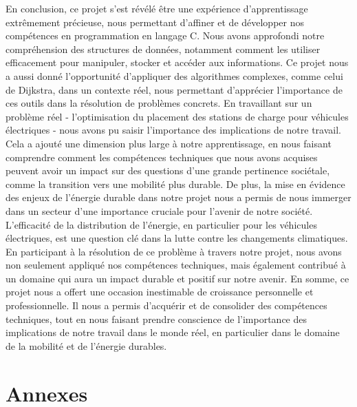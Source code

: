 \documentclass[french,a4paper]{article}
\begin{document}
    En conclusion, ce projet s'est révélé être une expérience d'apprentissage extrêmement précieuse, nous permettant d'affiner et de développer nos compétences en programmation en langage C. Nous avons approfondi notre compréhension des structures de données, notamment comment les utiliser efficacement pour manipuler, stocker et accéder aux informations. Ce projet nous a aussi donné l'opportunité d'appliquer des algorithmes complexes, comme celui de Dijkstra, dans un contexte réel, nous permettant d'apprécier l'importance de ces outils dans la résolution de problèmes concrets.
    \newline
    En travaillant sur un problème réel - l'optimisation du placement des stations de charge pour véhicules électriques - nous avons pu saisir l'importance des implications de notre travail. Cela a ajouté une dimension plus large à notre apprentissage, en nous faisant comprendre comment les compétences techniques que nous avons acquises peuvent avoir un impact sur des questions d'une grande pertinence sociétale, comme la transition vers une mobilité plus durable.
    \newline
    De plus, la mise en évidence des enjeux de l'énergie durable dans notre projet nous a permis de nous immerger dans un secteur d'une importance cruciale pour l'avenir de notre société. L'efficacité de la distribution de l'énergie, en particulier pour les véhicules électriques, est une question clé dans la lutte contre les changements climatiques. En participant à la résolution de ce problème à travers notre projet, nous avons non seulement appliqué nos compétences techniques, mais également contribué à un domaine qui aura un impact durable et positif sur notre avenir.
    \newline
    En somme, ce projet nous a offert une occasion inestimable de croissance personnelle et professionnelle. Il nous a permis d'acquérir et de consolider des compétences techniques, tout en nous faisant prendre conscience de l'importance des implications de notre travail dans le monde réel, en particulier dans le domaine de la mobilité et de l'énergie durables.

    \section{Annexes}
\end{document}
